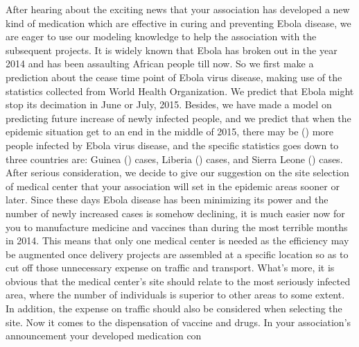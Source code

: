 \documentclass[11pt]{article}
\begin{document}
    After hearing about the exciting news that your association has developed a new kind of medication which are effective in curing and preventing Ebola disease, we are eager to use our modeling knowledge to help the association with the subsequent projects. 
    It is widely known that Ebola has broken out in the year 2014 and has been assaulting African people till now. So we first make a prediction about the cease time point of Ebola virus disease, making use of the statistics collected from World Health Organization. We predict that Ebola might stop its decimation in June or July, 2015. Besides, we have made a model on predicting future increase of newly infected people, and we predict that when the epidemic situation get to an end in the middle of 2015, there may be () more people infected by Ebola virus disease, and the specific statistics goes down to three countries are: Guinea () cases, Liberia () cases, and Sierra Leone () cases. After serious consideration, we decide to give our suggestion on the site selection of medical center that your association will set in the epidemic areas sooner or later. Since these days Ebola disease has been minimizing its power and the number of newly increased cases is somehow declining, it is much easier now for you to manufacture medicine and vaccines than during the most terrible months in 2014. This means that only one medical center is needed as the efficiency may be augmented once delivery projects are assembled at a specific location so as to cut off those unnecessary expense on traffic and transport. What's more, it is obvious that the medical center's site should relate to the most seriously infected area, where the number of individuals is superior to other areas to some extent. In addition, the expense on traffic should also be considered when selecting the site. 
    Now it comes to the dispensation of vaccine and drugs. In your association's announcement your developed medication con







\medskip


\end{document}
